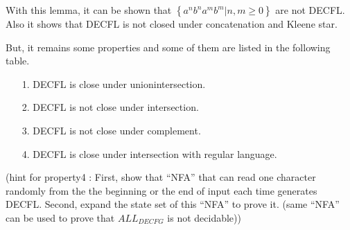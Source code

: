 \documentclass{article}
\begin{document}
\begin{itemize}
            With this lemma, it can be shown that $\left\{ a^{n}b^{n}a^{m}b^{m} | n,m \geq 0 \right\}$ are not DECFL. Also it shows that DECFL is not closed under concatenation and Kleene star.
            
            But, it remains some properties and some of them are listed in the following table.
            \begin{itemize}
						\item[1. ] DECFL is close under unionintersection.
						\item[2. ] DECFL is not close under intersection.
						\item[3. ] DECFL is not close under complement.
						\item[4. ] DECFL is close under intersection with regular language.
					\end{itemize}
            (hint for property4 : First, show that ``NFA'' that can read one character randomly from the the beginning or the end of input each time generates DECFL. Second, expand the state set of this ``NFA'' to prove it. (same ``NFA'' can be used to prove that $ALL_{DECFG}$ is not decidable))
            
            
    \end{itemize}

    
\end{document}
